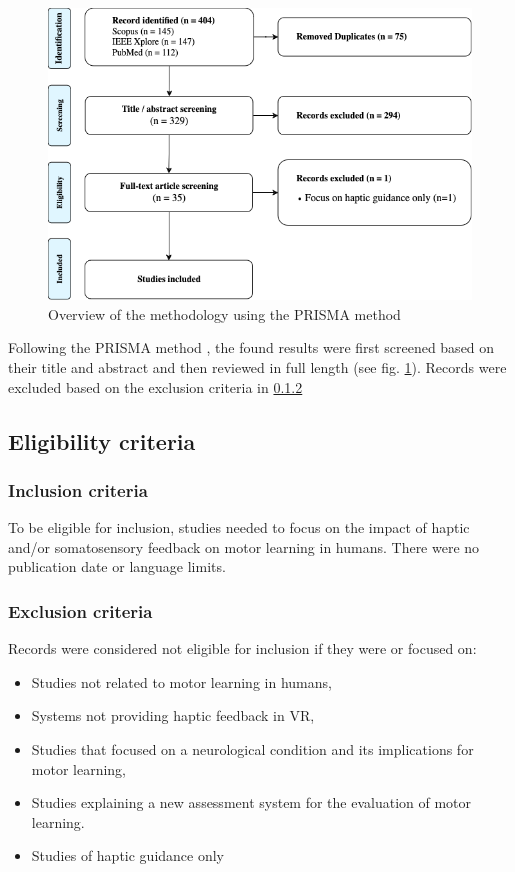 \documentclass[conference]{IEEEtran}
\begin{document}
\begin{figure}[ht]
    \centering
    \includegraphics[width=\columnwidth]{prisma_overview.png} 
    \caption{Overview of the methodology using the PRISMA method}
    \label{fig:prisma}
\end{figure}

Following the PRISMA method \cite{Page2021TheReviews}, the found results were first screened based on their title and abstract and then reviewed in full length (see fig. \ref{fig:prisma}). Records were excluded based on the exclusion criteria in \ref{sec:exclusion}

\subsection{Eligibility criteria}
\label{sec:eligibility}
\subsubsection{Inclusion criteria}
To be eligible for inclusion, studies needed to focus on the impact of haptic and/or somatosensory feedback on motor learning in humans. There were no publication date or language limits. 

\subsubsection{Exclusion criteria}
\label{sec:exclusion}
Records were considered not eligible for inclusion if they were or focused on:
\begin{itemize}
    \item Studies not related to motor learning in humans,
    \item Systems not providing haptic feedback in VR,
    \item Studies that focused on a neurological condition and its implications for motor learning,
    \item Studies explaining a new assessment system for the evaluation of motor learning.
    \item Studies of haptic guidance only
\end{itemize}
\end{document}
